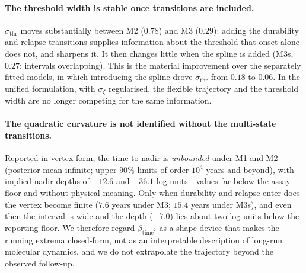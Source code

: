 \documentclass[11pt]{article}
\begin{document}
\paragraph{The threshold width is stable once transitions are included.}
$\sigma_{\mathrm{thr}}$ moves substantially between M2 ($0.78$) and M3
($0.29$): adding the durability and relapse transitions supplies information
about the threshold that onset alone does not, and sharpens it. It then
changes little when the spline is added (M3s, $0.27$; intervals overlapping).
This is the material improvement over the separately fitted models, in which
introducing the spline drove $\sigma_{\mathrm{thr}}$ from $0.18$ to $0.06$. In
the unified formulation, with $\sigma_\zeta$ regularised, the flexible
trajectory and the threshold width are no longer competing for the same
information.

\paragraph{The quadratic curvature is not identified without the
multi-state transitions.} Reported in vertex form, the time to nadir is
\emph{unbounded} under M1 and M2 (posterior mean infinite; upper $90\%$ limits
of order $10^{4}$ years and beyond), with implied nadir depths of $-12.6$ and
$-36.1$ log units---values far below the assay floor and without physical
meaning. Only when durability and relapse enter does the vertex become finite
($7.6$ years under M3; $15.4$ years under M3s), and even then the interval is
wide and the depth ($-7.0$) lies about two log units below the reporting
floor. We therefore regard $\beta_{\mathrm{time}^2}$ as a shape device that
makes the running extrema closed-form, not as an interpretable description of
long-run molecular dynamics, and we do not extrapolate the trajectory beyond
the observed follow-up.
\end{document}
